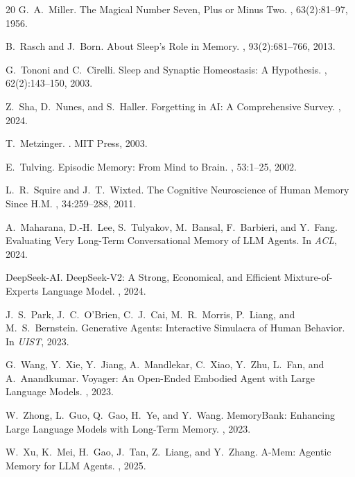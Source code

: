 \documentclass[11pt,twocolumn]{article}
\begin{document}
\begin{thebibliography}{20}
G.~A.~Miller.
\newblock The Magical Number Seven, Plus or Minus Two.
, 63(2):81--97, 1956.

B.~Rasch and J.~Born.
\newblock About Sleep's Role in Memory.
, 93(2):681--766, 2013.

G.~Tononi and C.~Cirelli.
\newblock Sleep and Synaptic Homeostasis: A Hypothesis.
, 62(2):143--150, 2003.

Z.~Sha, D.~Nunes, and S.~Haller.
\newblock Forgetting in AI: A Comprehensive Survey.
, 2024.

T.~Metzinger.
.
\newblock MIT Press, 2003.

E.~Tulving.
\newblock Episodic Memory: From Mind to Brain.
, 53:1--25, 2002.

L.~R.~Squire and J.~T.~Wixted.
\newblock The Cognitive Neuroscience of Human Memory Since H.M.
, 34:259--288, 2011.

A.~Maharana, D.-H.~Lee, S.~Tulyakov, M.~Bansal, F.~Barbieri, and Y.~Fang.
\newblock Evaluating Very Long-Term Conversational Memory of LLM Agents.
\newblock In {\em ACL}, 2024.

DeepSeek-AI.
\newblock DeepSeek-V2: A Strong, Economical, and Efficient Mixture-of-Experts Language Model.
, 2024.

J.~S.~Park, J.~C.~O'Brien, C.~J.~Cai, M.~R.~Morris, P.~Liang, and M.~S.~Bernstein.
\newblock Generative Agents: Interactive Simulacra of Human Behavior.
\newblock In {\em UIST}, 2023.

G.~Wang, Y.~Xie, Y.~Jiang, A.~Mandlekar, C.~Xiao, Y.~Zhu, L.~Fan, and A.~Anandkumar.
\newblock Voyager: An Open-Ended Embodied Agent with Large Language Models.
, 2023.

W.~Zhong, L.~Guo, Q.~Gao, H.~Ye, and Y.~Wang.
\newblock MemoryBank: Enhancing Large Language Models with Long-Term Memory.
, 2023.

W.~Xu, K.~Mei, H.~Gao, J.~Tan, Z.~Liang, and Y.~Zhang.
\newblock A-Mem: Agentic Memory for LLM Agents.
, 2025.

\end{thebibliography}
\end{document}
